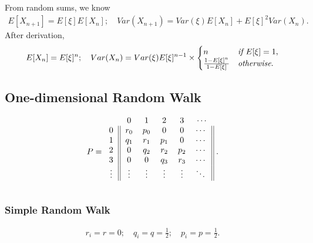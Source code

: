 \documentclass{article}
\begin{document}
From random sums, we know
\begin{align*}
    E[X_{n+1}] = E[\xi]E[X_{n}]; \quad Var(X_{n+1}) = Var(\xi)E[X_n] + E[\xi]^2Var(X_n).
\end{align*}
After derivation, 
\begin{align*}
    E[X_n] = E[\xi]^n; \quad Var(X_n) = Var(\xi)E[\xi]^{n-1}\times \begin{cases}
        n & \emph{if } E[\xi] = 1, \\
        \frac{1-E[\xi]^n}{1-E[\xi]} & \emph{otherwise}.
    \end{cases}
\end{align*}
    
\subsection{One-dimensional Random Walk}
\begin{align*}
    P = 
    \begin{blockarray}{cccccc}
        & 0 & 1 & 2 & 3 & \cdots \\
        \begin{block}{c||ccccc||}
            0 & r_0 & p_0 & 0 & 0 & \cdots \\
            1 & q_1 & r_1 & p_1 & 0 & \cdots \\
            2 & 0 & q_2 & r_2 & p_2 & \cdots \\
            3 & 0 & 0 & q_3 & r_3 & \cdots \\
            \vdots & \vdots & \vdots & \vdots & \vdots & \ddots \\
        \end{block} 
    \end{blockarray}\; .
\end{align*}

\subsubsection{Simple Random Walk}
\begin{align*}
    r_i = r = 0; \quad q_i = q = \frac{1}{2}; \quad p_i = p = \frac{1}{2}.
\end{align*}
\end{document}
